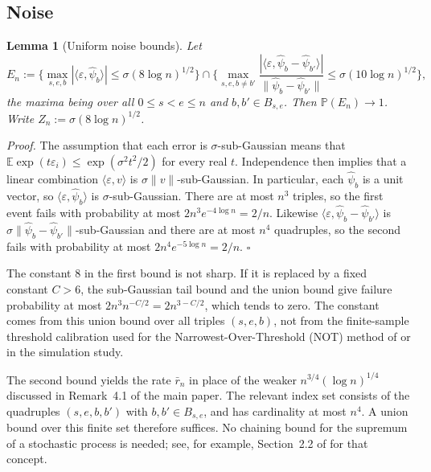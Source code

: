 \documentclass[12pt, a4paper]{article}
\newcommand{\qed}{\hfill$\square$}
\newenvironment{proof}[1][Proof]{\par\noindent\textit{#1.}\space}{\qed\par\medskip}
\newtheorem{lemma}{Lemma}[section]
\begin{document}
\subsection{Noise}

\begin{lemma}[Uniform noise bounds]
\label{lem:noise}
Let
\[
E_n := \Big\{ \max_{s,e,b} |\langle \varepsilon, \hat\psi_b\rangle| \le
\sigma(8\log n)^{1/2} \Big\} \cap
\Big\{ \max_{s,e,b \ne b'} \frac{|\langle \varepsilon, \hat\psi_b -
\hat\psi_{b'}\rangle|}{\|\hat\psi_b - \hat\psi_{b'}\|} \le
\sigma(10\log n)^{1/2} \Big\},
\]
the maxima being over all $0 \le s < e \le n$ and $b,b' \in B_{s,e}$. Then
$\mathbb{P}(E_n) \to 1$. Write $Z_n := \sigma(8\log n)^{1/2}$.
\end{lemma}

\begin{proof}
The assumption that each error is $\sigma$-sub-Gaussian means that
$\mathbb E\exp(t\varepsilon_i)\le\exp(\sigma^2t^2/2)$ for every real $t$.
Independence then implies that a linear combination
$\langle\varepsilon,v\rangle$ is
$\sigma\|v\|$-sub-Gaussian. In particular, each $\hat\psi_b$ is a unit vector,
so $\langle\varepsilon,\hat\psi_b\rangle$ is $\sigma$-sub-Gaussian. There are
at most $n^3$ triples, so the first event
fails with probability at most $2n^3 e^{-4\log n} = 2/n$. Likewise
$\langle\varepsilon,\hat\psi_b - \hat\psi_{b'}\rangle$ is
$\sigma\|\hat\psi_b-\hat\psi_{b'}\|$-sub-Gaussian and there are at most $n^4$
quadruples, so the second fails with probability at most
$2n^4e^{-5\log n} = 2/n$.
\end{proof}

The constant 8 in the first bound is not sharp. If it is replaced by a fixed
constant $C>6$, the sub-Gaussian tail bound and the union bound give failure
probability at most $2n^3n^{-C/2}=2n^{3-C/2}$, which tends to zero. The
constant comes from this union bound over all triples $(s,e,b)$, not from the
finite-sample threshold calibration used for the Narrowest-Over-Threshold
(NOT) method of \citet{bcf16} or in the simulation study.

The second bound yields the rate $\bar r_n$ in place of the weaker
$n^{3/4}(\log n)^{1/4}$ discussed in Remark~4.1 of the main paper. The relevant
index set consists of the quadruples $(s,e,b,b')$ with
$b,b'\in B_{s,e}$, and has cardinality at most $n^4$. A union bound over this
finite set therefore suffices. No chaining bound for the supremum of a
stochastic process is needed; see, for example, Section~2.2 of
\citet{vdvw96} for that concept.
\end{document}
